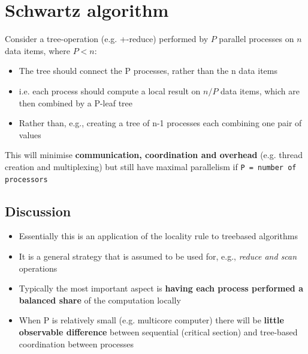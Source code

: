 \documentclass{article}
\begin{document}
\tableofcontents

\newpage

\section{Schwartz	algorithm}
\begin{flushleft}
Consider a tree-operation (e.g. +-reduce) performed by $P$ parallel processes on $n$ data items, where $P < n$:
\begin{itemize}
  \item The tree should connect the P processes, rather than the n data items
  \item i.e. each process should compute a local result on $n / P$ data items, which are then combined by a P-leaf tree 
  \item Rather than, e.g., creating a tree of n-1 processes each combining one pair of values 
\end{itemize}
This will minimise \textbf{communication, coordination and overhead} (e.g. thread creation and multiplexing) but still have maximal parallelism if \texttt{P = number of processors}
\end{flushleft}

\subsection{Discussion}
\begin{itemize}
  \item Essentially this is an application of the locality rule to treebased algorithms 
  \item It is a general strategy that is assumed to be used for, e.g., \textit{reduce and scan} operations 
  \item Typically the most important aspect is \textbf{having each process performed a balanced share} of the computation locally
  \item When P is relatively small (e.g. multicore computer) there will be \textbf{little observable difference} between sequential (critical section) and tree-based coordination between processes
\end{itemize}
\end{document}
